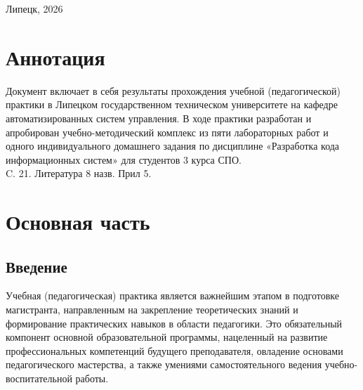 \vfill
\begin{center}
    Липецк, 2026
\end{center}

\thispagestyle{empty}

\newpage
\section*{Аннотация}

Документ включает в себя результаты прохождения учебной (педагогической) практики
в Липецком государственном техническом университете на кафедре
автоматизированных систем управления. В ходе практики разработан и апробирован
учебно-методический комплекс из пяти лабораторных работ и одного
индивидуального домашнего задания по дисциплине «Разработка кода информационных
систем» для студентов 3 курса СПО. \\
C. 21. Литература 8 назв. Прил 5.

\newpage
\tableofcontents
\newpage

\section{Основная часть}

\subsection*{Введение}

Учебная (педагогическая) практика является важнейшим этапом в подготовке магистранта, направленным на закрепление теоретических знаний и формирование практических навыков в области педагогики. Это обязательный компонент основной образовательной программы, нацеленный на развитие профессиональных компетенций будущего преподавателя, овладение основами педагогического мастерства, а также умениями самостоятельного ведения учебно-воспитательной работы.

